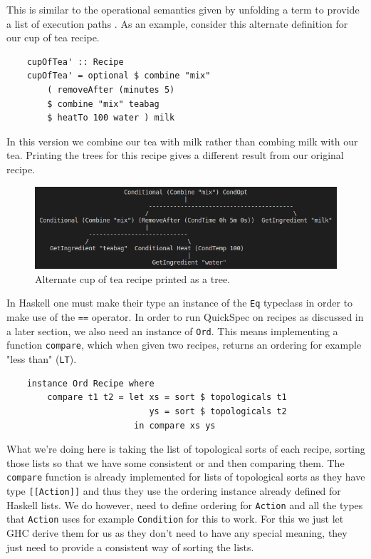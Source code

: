 \documentclass[11pt]{article}
\begin{document}
This is similar to the operational semantics given by unfolding a
term to provide a list of execution paths \cite{hutton}. As an example,
consider this alternate definition for our cup of tea recipe.

\begin{lstlisting}
    cupOfTea' :: Recipe
    cupOfTea' = optional $ combine "mix" 
        ( removeAfter (minutes 5)
        $ combine "mix" teabag
        $ heatTo 100 water ) milk
\end{lstlisting}

In this version we combine our tea with milk rather than combing milk with our tea.
Printing the trees for this recipe gives a different result from our original recipe.

\begin{figure}[h]
\includegraphics[width=\textwidth, keepaspectratio]{cupOfTea2.png}
\centering
\caption{Alternate cup of tea recipe printed as a tree.}
\end{figure}

In Haskell one must make their type an instance of the \texttt{Eq} typeclass in
order to make use of the \texttt{==} operator. In order to run QuickSpec on recipes
as discussed in a later section, we also need an instance of \texttt{Ord}.
This means implementing a function \texttt{compare}, which when given two recipes,
returns an ordering for example "less than" (\texttt{LT}).

\begin{lstlisting}
    instance Ord Recipe where
        compare t1 t2 = let xs = sort $ topologicals t1
                            ys = sort $ topologicals t2
                         in compare xs ys
\end{lstlisting}

What we're doing here is taking the list of topological sorts of each recipe, sorting those
lists so that we have some consistent or and then comparing them. The \texttt{compare} function
is already implemented for lists of topological sorts as they have type \texttt{[[Action]]}
and thus they use the ordering instance already defined for Haskell lists. We do however,
need to define ordering for \texttt{Action} and all the types that \texttt{Action} uses
for example \texttt{Condition} for this to work. For this we just let GHC derive them for
us as they don't need to have any special meaning, they just need to provide a consistent
way of sorting the lists.
\end{document}
